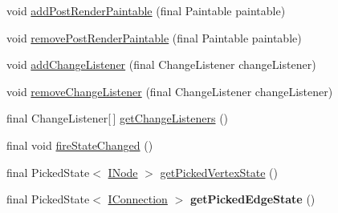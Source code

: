 \begin{DoxyCompactItemize}
\item 
void \hyperlink{classedu_1_1kit_1_1trufflehog_1_1view_1_1_network_graph_view_afc5f42c742e23ca3e2c214e5cce4d1ec}{add\+Post\+Render\+Paintable} (final Paintable paintable)
\item 
void \hyperlink{classedu_1_1kit_1_1trufflehog_1_1view_1_1_network_graph_view_aee8a4ed17f4c50db2a23687024626dcf}{remove\+Post\+Render\+Paintable} (final Paintable paintable)
\item 
void \hyperlink{classedu_1_1kit_1_1trufflehog_1_1view_1_1_network_graph_view_ad2330a910e259160cc33b5c25618f4f7}{add\+Change\+Listener} (final Change\+Listener change\+Listener)
\item 
void \hyperlink{classedu_1_1kit_1_1trufflehog_1_1view_1_1_network_graph_view_a73ffbb05804f2c6c5e8cf741a2bda18c}{remove\+Change\+Listener} (final Change\+Listener change\+Listener)
\item 
final Change\+Listener\mbox{[}$\,$\mbox{]} \hyperlink{classedu_1_1kit_1_1trufflehog_1_1view_1_1_network_graph_view_a0add2abc594c411de5f193bfa46d83da}{get\+Change\+Listeners} ()
\item 
final void \hyperlink{classedu_1_1kit_1_1trufflehog_1_1view_1_1_network_graph_view_a7a2ddf85df73f87dcea221a27e4fc1d6}{fire\+State\+Changed} ()
\item 
final Picked\+State$<$ \hyperlink{interfaceedu_1_1kit_1_1trufflehog_1_1model_1_1graph_1_1_i_node}{I\+Node} $>$ \hyperlink{classedu_1_1kit_1_1trufflehog_1_1view_1_1_network_graph_view_a9afe67eb5123b704e076868b994085e7}{get\+Picked\+Vertex\+State} ()
\item 
\hypertarget{classedu_1_1kit_1_1trufflehog_1_1view_1_1_network_graph_view_aba0bf3640125c77d7f2ba83466e2da9a}{}final Picked\+State$<$ \hyperlink{interfaceedu_1_1kit_1_1trufflehog_1_1model_1_1graph_1_1_i_connection}{I\+Connection} $>$ {\bfseries get\+Picked\+Edge\+State} ()\label{classedu_1_1kit_1_1trufflehog_1_1view_1_1_network_graph_view_aba0bf3640125c77d7f2ba83466e2da9a}


\end{DoxyCompactItemize}
